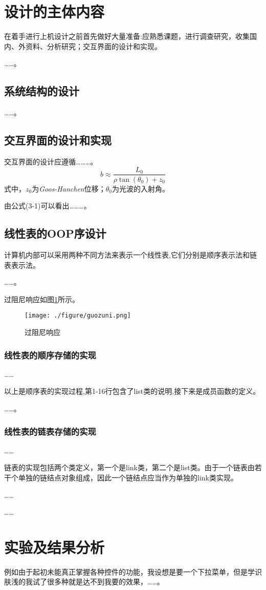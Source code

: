 \section{设计的主体内容}
在着手进行上机设计之前首先做好大量准备:应熟悉课题，进行调查研究，收集国内、外资料、分析研究；交互界面的设计和实现。

……。
\subsection{系统结构的设计}
……。
\subsection{交互界面的设计和实现}
交互界面的设计应遵循………。
\begin{equation}
        b\approx\frac{L_0}{\rho\tan(\theta_0)+z_0}
\end{equation}
式中，$z_0$为\textit{Goos-Hanchen}位移；$\theta_0$为光波的入射角。

由公式(3-1)可以看出………。
\subsection{线性表的OOP序设计}
计算机内部可以采用两种不同方法来表示一个线性表,它们分别是顺序表示法和链表表示法。

……。

过阻尼响应如图\ref{guozuni}所示。
\begin{figure}[htbp]
\centering

\texttt{[image: ./figure/guozuni.png]}
\caption{过阻尼响应}
\label{guozuni}
\end{figure}
\subsubsection{线性表的顺序存储的实现}
……

以上是顺序表的实现过程,第1-16行包含了list类的说明,接下来是成员函数的定义。

……。
\subsubsection{线性表的链表存储的实现}
……

链表的实现包括两个类定义，第一个是link类，第二个是list类。由于一个链表由若干个单独的链结点对象组成，因此一个链结点应当作为单独的link类实现。

……

……

\section{实验及结果分析}
例如由于起初未能真正掌握各种控件的功能，我设想是要一个下拉菜单，但是学识肤浅的我试了很多种就是达不到我要的效果，……。

